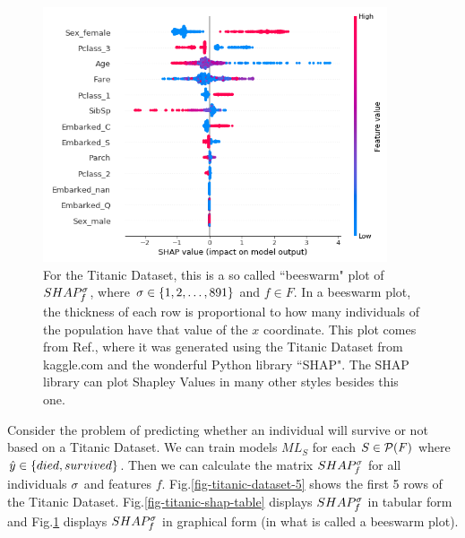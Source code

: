 \begin{enumerate}
\begin{figure}[h!]
\centering
\includegraphics[width=4in]
{shapley/titanic-shap-plot.png}
\caption{For the Titanic Dataset, 
this is a so called
``beeswarm" plot of $SHAP^\sigma_f$, where 
$\sigma\in \{1,2, \ldots, 891\}$
and $f\in F$.
In a beeswarm
plot, the thickness
of each row
is proportional to
how many 
individuals of the population
have that value 
of the $x$ coordinate.
This plot comes from 
Ref.\cite{maz-shap-titanic},
where it was generated using
the Titanic Dataset from kaggle.com and
the wonderful Python library ``SHAP".
The SHAP library can plot
Shapley Values 
in many other styles
besides this one.} 
\label{fig-titanic-shap-plot}
\end{figure}
\end{enumerate}

Consider the problem of
predicting 
whether an individual
will survive or not
based on a Titanic Dataset.
We can train models
$ML_S$ for each $S\in {\cal P}(F)$
where
${\hat{y}}\in\{died, survived\}$.
Then we can
calculate the matrix
$SHAP^\sigma_f$
for all
individuals
$\sigma$
and features $f$.
Fig.\ref{fig-titanic-dataset-5}
shows the first 5
rows
of the Titanic Dataset.
Fig.\ref{fig-titanic-shap-table}
displays
$SHAP^\sigma_f$ in tabular
form and Fig.\ref{fig-titanic-shap-plot}
displays $SHAP^\sigma_f$
in graphical form (in 
what is called a beeswarm plot).